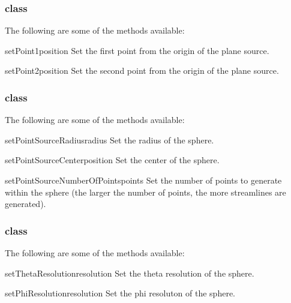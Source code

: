 \subsubsection{\PlaneSource class}

The following are some of the methods available:

\begin{methoddesc}[PlaneSource]{setPoint1}{position}
Set the first point from the origin of the plane source.
\end{methoddesc}

\begin{methoddesc}[PlaneSource]{setPoint2}{position}
Set the second point from the origin of the plane source.
\end{methoddesc}

\subsubsection{\PointSource class}

The following are some of the methods available:

\begin{methoddesc}[PointSource]{setPointSourceRadius}{radius}
Set the radius of the sphere.
\end{methoddesc}

\begin{methoddesc}[PointSource]{setPointSourceCenter}{position}
Set the center of the sphere.
\end{methoddesc}

\begin{methoddesc}[PointSource]{setPointSourceNumberOfPoints}{points}
Set the number of points to generate within the sphere (the larger the
number of points, the more streamlines are generated).
\end{methoddesc}

\subsubsection{\Sphere class}

The following are some of the methods available:

\begin{methoddesc}[Sphere]{setThetaResolution}{resolution}
Set the theta resolution of the sphere.
\end{methoddesc}

\begin{methoddesc}[Sphere]{setPhiResolution}{resolution}
Set the phi resoluton of the sphere.
\end{methoddesc}

